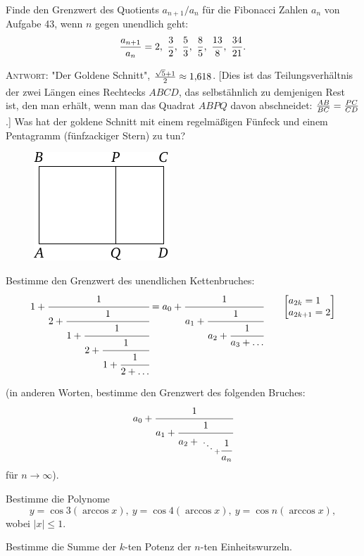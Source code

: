 \documentclass[12pt]{article} %
\begin{document}
\bigskip
{} Finde den Grenzwert des Quotients $a_{n+1}/a_n$ für die Fibonacci Zahlen $a_n$ von Aufgabe 43, wenn $n$ gegen unendlich geht: 
\vspace{2\jot}
\[
\frac{a_{n+1}}{a_n}=2,\ \frac 32,\ \frac53, \ \frac85, \ \frac{13}8,
\ \frac{34}{21}.
\vspace{\jot}
\] 

\textsc{Antwort:} "Der Goldene Schnitt",
$\frac{\sqrt{5}+1}{2\vphantom)} \approx 1{,}618$. [Dies ist das Tei\-lungs\-ver\-hält\-nis der zwei Längen eines Rechtecks $ABCD$, das selbstähnlich zu demjenigen Rest ist, den man erhält, wenn man das Quadrat $ABPQ$ davon abschneidet: 
$\frac{AB}{BC}=\frac{PC}{CD\vphantom)}$.] Was hat der goldene Schnitt mit einem regelmäßigen Fünfeck und einem Pentagramm (fünfzackiger Stern) zu tun?

\begin{figure}[h]
\centering
\includegraphics{taskbook-37}
\end{figure}

\newpage
{} Bestimme den Grenzwert des unendlichen Kettenbruches:
\begin{align*}
1+\cfrac{1}{2+\cfrac{1}{1+\cfrac{1}{2+\cfrac{1}{1+\cfrac{1}{2+\ldots}}}}}=
a_0+\cfrac{1}{a_1+\cfrac{1}{a_2+\cfrac{1}{a_3+\dots}}} \qquad
\smash{
{\left[\begin{aligned} &a_{2k}=1 \\[-\jot] &a_{2k+1}
=2 \end{aligned}\right]} }
\end{align*}

\medskip

\noindent (in anderen Worten, bestimme den Grenzwert des folgenden Bruches:
$$
a_0+\cfrac{1}{a_1+\cfrac{1}{a_2+{\atop{\ddots \atop {}} + \cfrac{1}{a_n}}
} 
}
$$
für $n \to \infty$).


\bigskip
{} Bestimme die Polynome 
\[
y=\cos 3 (\arccos x),\ y=\cos 4 (\arccos x),\ 
y=\cos n (\arccos x),
\] 
wobei $|x| \leqslant 1$. 


\bigskip
{} Bestimme die Summe der $k$-ten Potenz der $n$-ten Einheitswurzeln.
\end{document}
